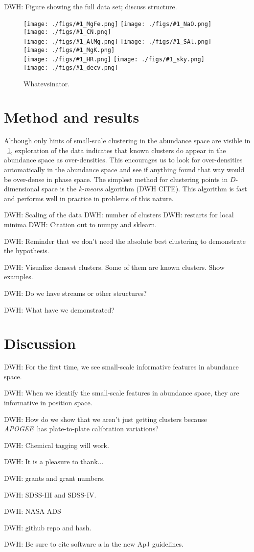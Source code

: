 \documentclass[12pt, letterpaper, preprint]{aastex}
\newcommand{\acronym}[1]{{\small{#1}}}
\newcommand{\project}[1]{\textsl{#1}}
\newcommand{\apogee}{\project{\acronym{APOGEE}}}
\newcommand{\insanefigure}[1]{%
\texttt{[image: ./figs/\#1\_MgFe.png]}%
\texttt{[image: ./figs/\#1\_NaO.png]}%
\texttt{[image: ./figs/\#1\_CN.png]}\\
\texttt{[image: ./figs/\#1\_AlMg.png]}%
\texttt{[image: ./figs/\#1\_SAl.png]}%
\texttt{[image: ./figs/\#1\_MgK.png]}\\
\texttt{[image: ./figs/\#1\_HR.png]}%
\texttt{[image: ./figs/\#1\_sky.png]}%
\texttt{[image: ./figs/\#1\_decv.png]}}
\begin{document}
DWH: Figure showing the full data set; discuss structure.

\begin{figure}[!p]
\insanefigure{all}
\caption{Whatevsinator.\label{fig:all}}
\end{figure}

\clearpage{}
\section{Method and results}

Although only hints of small-scale clustering in the abundance space
are visible in \figurename~\ref{fig:all}, exploration of the data indicates that
known clusters do appear in the abundance space as over-densities.
This encourages us to look for over-densities automatically in the
abundance space and see if anything found that way would be over-dense
in phase space.
The simplest method for clustering points in $D$-dimensional space is
the \emph{k-means} algorithm (DWH CITE).
This algorithm is fast and performs well in practice in problems of
this nature.

DWH: Scaling of the data
DWH: number of clusters
DWH: restarts for local minima
DWH: Citation out to numpy and sklearn.

DWH: Reminder that we don't need the absolute best clustering to
demonstrate the hypothesis.

DWH: Visualize densest clusters.  Some of them are known clusters.
Show examples.

DWH: Do we have streams or other structures?

DWH: What have we demonstrated?

\section{Discussion}

DWH: For the first time, we see small-scale informative features in abundance space.

DWH: When we identify the small-scale features in abundance space, they are informative in position space.

DWH: How do we show that we aren't just getting clusters because \apogee\ has plate-to-plate calibration variations?

DWH: Chemical tagging will work.

\acknowledgements
DWH: It is a pleasure to thank...

DWH: grants and grant numbers.

DWH: SDSS-III and SDSS-IV.

DWH: NASA ADS

DWH: github repo and hash.

DWH: Be sure to cite software a la the new ApJ guidelines.
\end{document}
